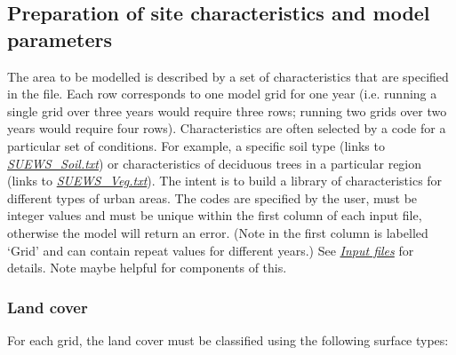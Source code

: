 \documentclass[letterpaper,10pt,english]{sphinxmanual}
\begin{document}
\subsection{Preparation of site characteristics and model parameters}
\label{\detokenize{prepare-to-run-the-model:preparation-of-site-characteristics-and-model-parameters}}
The area to be modelled is described by a set of characteristics that
are specified in the {\hyperref[\detokenize{input_files/SUEWS_SiteInfo/SUEWS_SiteSelect:suews-siteselect-txt}]{}}
file. Each row corresponds to one model grid for one year (i.e. running
a single grid over three years would require three rows; running two
grids over two years would require four rows). Characteristics are often
selected by a code for a particular set of conditions. For example, a
specific soil type (links to {\hyperref[\detokenize{prepare-to-run-the-model:SUEWS_Soil.txt}]{\emph{SUEWS\_Soil.txt}}}) or
characteristics of deciduous trees in a particular region (links to
{\hyperref[\detokenize{prepare-to-run-the-model:SUEWS_Veg.txt}]{\emph{SUEWS\_Veg.txt}}}). The intent is to build a library of
characteristics for different types of urban areas. The codes are
specified by the user, must be integer values and must be unique within
the first column of each input file, otherwise the model will return an
error. (Note in {\hyperref[\detokenize{input_files/SUEWS_SiteInfo/SUEWS_SiteSelect:suews-siteselect-txt}]{}} the
first column is labelled ‘Grid’ and can contain repeat values for
different years.) See {\hyperref[\detokenize{prepare-to-run-the-model:Input_files}]{\emph{Input files}}} for details. Note
 maybe helpful for
components of this.


\subsubsection{Land cover}
\label{\detokenize{prepare-to-run-the-model:land-cover}}
For each grid, the land cover must be classified using the following
surface types:
\end{document}
